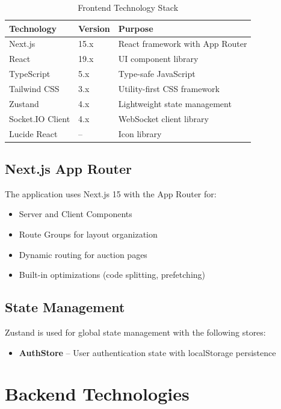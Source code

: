 \documentclass[12pt,a4paper]{report}
\begin{document}
\begin{table}[H]
\centering
\begin{tabularx}{\textwidth}{|l|l|X|}
\hline
\textbf{Technology} & \textbf{Version} & \textbf{Purpose} \\
\hline
Next.js & 15.x & React framework with App Router \\
\hline
React & 19.x & UI component library \\
\hline
TypeScript & 5.x & Type-safe JavaScript \\
\hline
Tailwind CSS & 3.x & Utility-first CSS framework \\
\hline
Zustand & 4.x & Lightweight state management \\
\hline
Socket.IO Client & 4.x & WebSocket client library \\
\hline
Lucide React & -- & Icon library \\
\hline
\end{tabularx}
\caption{Frontend Technology Stack}
\end{table}

\subsection{Next.js App Router}

The application uses Next.js 15 with the App Router for:
\begin{itemize}
    \item Server and Client Components
    \item Route Groups for layout organization
    \item Dynamic routing for auction pages
    \item Built-in optimizations (code splitting, prefetching)
\end{itemize}

\subsection{State Management}

Zustand is used for global state management with the following stores:
\begin{itemize}
    \item \textbf{AuthStore} -- User authentication state with localStorage persistence
\end{itemize}

\section{Backend Technologies}
\end{document}
